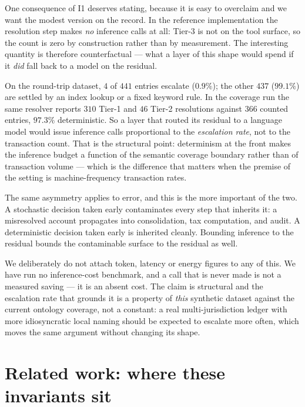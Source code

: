 \documentclass[11pt]{clapps}  %
\begin{document}
One consequence of I1 deserves stating, because it is easy to overclaim and we
want the modest version on the record. In the reference implementation the
resolution step makes \emph{no} inference calls at all: Tier-3 is not on the
tool surface, so the count is zero by construction rather than by measurement.
The interesting quantity is therefore counterfactual --- what a layer of this
shape would spend if it \emph{did} fall back to a model on the residual.

On the round-trip dataset, $4$ of $441$ entries escalate ($0.9\%$); the other
$437$ ($99.1\%$) are settled by an index lookup or a fixed keyword rule. In the
coverage run the same resolver reports $310$ Tier-1 and $46$ Tier-2 resolutions
against $366$ counted entries, $97.3\%$ deterministic. So a layer that routed
its residual to a language model would issue inference calls proportional to the
\emph{escalation rate}, not to the transaction count. That is the structural
point: determinism at the front makes the inference budget a function of the
semantic coverage boundary rather than of transaction volume --- which is the
difference that matters when the premise of the setting is machine-frequency
transaction rates.

The same asymmetry applies to error, and this is the more important of the two.
A stochastic decision taken early contaminates every step that inherits it: a
misresolved account propagates into consolidation, tax computation, and audit.
A deterministic decision taken early is inherited cleanly. Bounding inference to
the residual bounds the contaminable surface to the residual as well.

We deliberately do not attach token, latency or energy figures to any of this.
We have run no inference-cost benchmark, and a call that is never made is not a
measured saving --- it is an absent cost. The claim is structural and the
escalation rate that grounds it is a property of \emph{this} synthetic dataset
against the current ontology coverage, not a constant: a real multi-jurisdiction
ledger with more idiosyncratic local naming should be expected to escalate more
often, which moves the same argument without changing its shape.

\section{Related work: where these invariants sit}
\label{sec:related}
\end{document}
